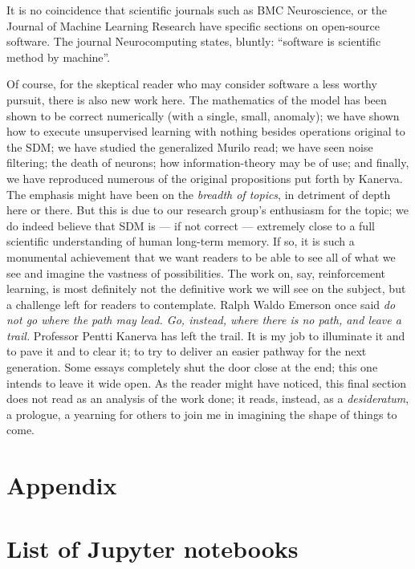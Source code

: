 It is no coincidence that scientific journals such as BMC Neuroscience, or the Journal of Machine Learning Research have specific sections on open-source software. The journal Neurocomputing states, bluntly: “software is scientific method by machine”.

Of course, for the skeptical reader who may consider software a less worthy pursuit, there is also new work here.  The mathematics of the model has been shown to be correct numerically (with a single, small, anomaly); we have shown how to execute unsupervised learning with nothing besides operations original to the SDM; we have studied the generalized Murilo read; we have seen noise filtering; the death of neurons; how information-theory may be of use; and finally, we have reproduced numerous of the original propositions put forth by Kanerva.  The emphasis might have been on the \emph{breadth of topics}, in detriment of depth here or there.  But this is due to our research group's enthusiasm for the topic; we do indeed believe that SDM is --- if not correct --- extremely close to a full scientific understanding of human long-term memory.  If so, it is such a monumental achievement that we want readers to be able to see all of what we see and imagine the vastness of possibilities.  The work on, say, reinforcement learning, is most definitely not the definitive work we will see on the subject, but a challenge left for readers to contemplate. Ralph Waldo Emerson once said \emph{do not go where the path may lead. Go, instead, where there is no path, and leave a trail.}  Professor Pentti Kanerva has left the trail.  It is my job to illuminate it and to pave it and to clear it; to try to deliver an easier pathway for the next generation.  Some essays completely shut the door close at the end; this one intends to leave it wide open. As the reader might have noticed, this final section does not read as an analysis of the work done; it reads, instead, as a \emph{desideratum}, a prologue, a yearning for others to join me in imagining the shape of things to come.











\chapter{Appendix}

%

\chapter*{List of Jupyter notebooks}
